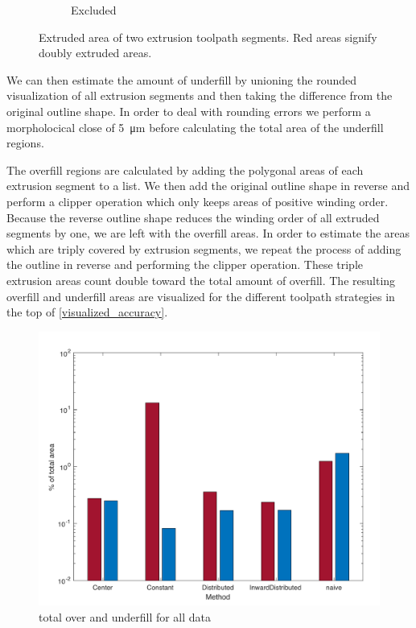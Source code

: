 \begin{figure}
\begin{subfigure}{\figwidth}
\caption{Excluded}
\end{subfigure}
\caption{
Extruded area of two extrusion toolpath segments.
Red areas signify doubly extruded areas.
}
\label{segment_visualization}
\end{figure}

We can then estimate the amount of underfill by unioning the rounded visualization of all extrusion segments and then taking the difference from the original outline shape.
In order to deal with rounding errors we perform a morpholocical close of \SI{5}{\micro\meter} before calculating the total area of the underfill regions.

The overfill regions are calculated by adding the polygonal areas of each extrusion segment to a list.
We then add the original outline shape in reverse and perform a clipper operation which only keeps areas of positive winding order.
Because the reverse outline shape reduces the winding order of all extruded segments by one, we are left with the overfill areas.
In order to estimate the areas which are triply covered by extrusion segments, we repeat the process of adding the outline in reverse and performing the clipper operation.
These triple extrusion areas count double toward the total amount of overfill.
The resulting overfill and underfill areas are visualized for the different toolpath strategies in the top of \cref{visualized_accuracy}.


\begin{figure}
\includegraphics[width=\columnwidth]{sources/validation/overunderfill.pdf}
\caption{total over and underfill for all data}
\label{over_underfill}
\end{figure}

